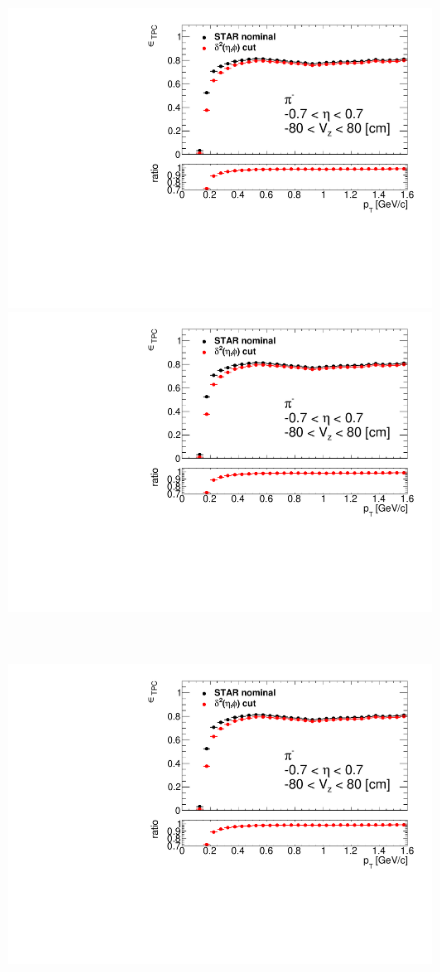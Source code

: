 \begin{figure}[ht]%
	\centering
	\parbox{0.329\textwidth}{
		\centering
		\includegraphics[width=\linewidth,page=1]{graphics/eff/tpcEffi.pdf}\\
		\includegraphics[width=\linewidth,page=4]{graphics/eff/tpcEffi.pdf}\\
	}~
	\parbox{0.329\textwidth}{
		\centering
		\includegraphics[width=\linewidth,page=2]{graphics/eff/tpcEffi.pdf}\\
}
\end{figure}
